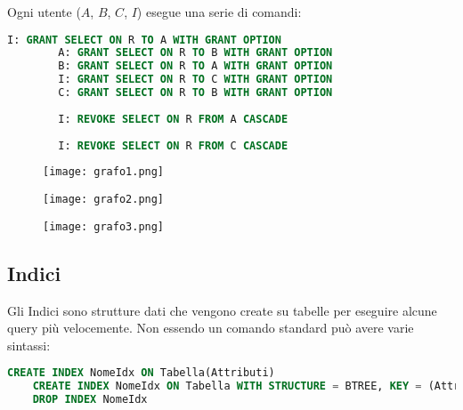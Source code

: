 \begin{example}
	Ogni utente ($A$, $B$, $C$, $I$) esegue una serie di comandi:
	\begin{lstlisting}[language=SQL]
		I: GRANT SELECT ON R TO A WITH GRANT OPTION
		A: GRANT SELECT ON R TO B WITH GRANT OPTION
		B: GRANT SELECT ON R TO A WITH GRANT OPTION
		I: GRANT SELECT ON R TO C WITH GRANT OPTION
		C: GRANT SELECT ON R TO B WITH GRANT OPTION
		
		I: REVOKE SELECT ON R FROM A CASCADE
		
		I: REVOKE SELECT ON R FROM C CASCADE
	\end{lstlisting}
	\begin{figure}[!h]
		\centering
		\begin{minipage}{.3\textwidth}
			\centering
			\texttt{[image: grafo1.png]}
		\end{minipage}
		\begin{minipage}{.3\textwidth}
			\centering
			\texttt{[image: grafo2.png]}
		\end{minipage}
		\begin{minipage}{.3\textwidth}
			\centering
			\texttt{[image: grafo3.png]}
		\end{minipage}
	\end{figure}
\end{example}

\subsection{Indici}
Gli Indici sono strutture dati che vengono create su tabelle per eseguire alcune query più velocemente. Non essendo un comando standard può avere varie sintassi:
\begin{lstlisting}[language=SQL]
	CREATE INDEX NomeIdx ON Tabella(Attributi)
	CREATE INDEX NomeIdx ON Tabella	WITH STRUCTURE = BTREE, KEY = (Attributi)
	DROP INDEX NomeIdx
\end{lstlisting}

\newpage
